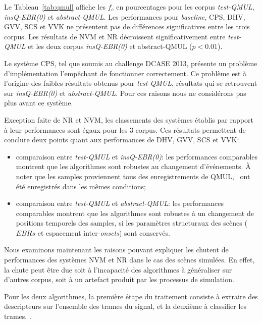 Le Tableau~\ref{tab:qmul} affiche les $f_c$ en pourcentages pour les corpus \emph{test-QMUL}, \emph{insQ-EBR(0)} et \emph{abstract-QMUL}. Les performances pour \emph{baseline}, CPS, DHV, GVV, SCS et VVK ne présentent pas de différences significatives entre les trois corpus. Les résultats de NVM et NR décroissent significativement entre \emph{test-QMUL} et les deux corpus \emph{insQ-EBR(0)} et abstract-QMUL ($p<0.01$).

Le système CPS, tel que soumis au challenge DCASE 2013, présente un problème d'implémentation l'empêchant de fonctionner correctement. Ce problème est à l'origine des faibles résultats obtenus pour \emph{test-QMUL}, résultats qui se retrouvent sur \emph{insQ-EBR(0)} et \emph{abstract-QMUL}. Pour ces raisons nous ne considérons pas plus avant ce système.

Exception faite de NR et NVM, les classements des systèmes établis par rapport à leur performances sont égaux pour les 3 corpus. Ces résultats permettent de conclure deux points quant aux performances de DHV, GVV, SCS et VVK:

\begin{itemize}
\item comparaison entre \emph{test-QMUL} et \emph{insQ-EBR(0)}: les performances comparables montrent que les algorithmes sont robustes au changement d'événements. À noter que les samples proviennent tous des enregistrements de QMUL, \ie~ont été enregistrés dans les mêmes conditions;
\item comparaison entre \emph{test-QMUL} et \emph{abstract-QMUL}: les performances comparables montrent que les algorithmes sont robustes à un changement de positions temporels  des samples, si les paramètres structuraux des scènes ($EBRs$ et espacement inter-\emph{onsets})  sont conservés.
\end{itemize}
  
Nous examinons maintenant les raisons pouvant expliquer les chutent de performances des systèmes NVM et NR dans le cas des scènes simulées. En effet, la chute peut être due soit à l'incapacité des algorithmes à généraliser sur d'autres corpus, soit à un artefact produit par les processus de simulation.

Pour les deux algorithmes, la première étape du traitement consiste à extraire des descripteurs sur l'ensemble des trames du signal, et la deuxième à classifier les trames. .

